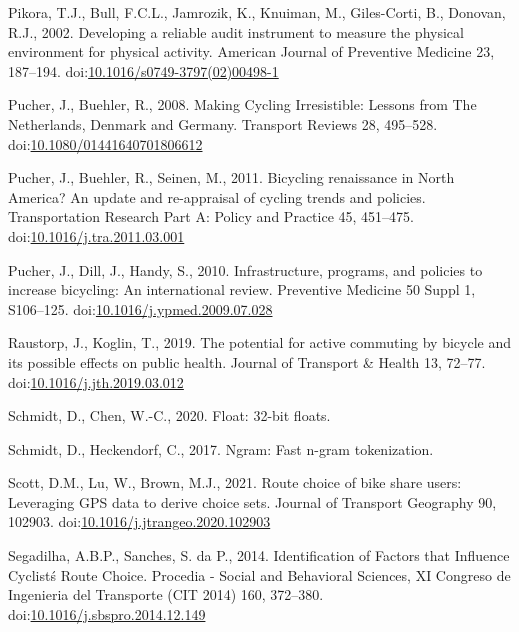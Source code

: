 \documentclass[]{elsarticle} %
\begin{document}
\leavevmode\hypertarget{ref-pikoraDevelopingReliableAudit2002}{}%
Pikora, T.J., Bull, F.C.L., Jamrozik, K., Knuiman, M., Giles-Corti, B.,
Donovan, R.J., 2002. Developing a reliable audit instrument to measure
the physical environment for physical activity. American Journal of
Preventive Medicine 23, 187--194.
doi:\href{https://doi.org/10.1016/s0749-3797(02)00498-1}{10.1016/s0749-3797(02)00498-1}

\leavevmode\hypertarget{ref-pucherMakingCyclingIrresistible2008}{}%
Pucher, J., Buehler, R., 2008. Making Cycling Irresistible: Lessons from
The Netherlands, Denmark and Germany. Transport Reviews 28, 495--528.
doi:\href{https://doi.org/10.1080/01441640701806612}{10.1080/01441640701806612}

\leavevmode\hypertarget{ref-pucherBicyclingRenaissanceNorth2011a}{}%
Pucher, J., Buehler, R., Seinen, M., 2011. Bicycling renaissance in
North America? An update and re-appraisal of cycling trends and
policies. Transportation Research Part A: Policy and Practice 45,
451--475.
doi:\href{https://doi.org/10.1016/j.tra.2011.03.001}{10.1016/j.tra.2011.03.001}

\leavevmode\hypertarget{ref-pucherInfrastructureProgramsPolicies2010a}{}%
Pucher, J., Dill, J., Handy, S., 2010. Infrastructure, programs, and
policies to increase bicycling: An international review. Preventive
Medicine 50 Suppl 1, S106--125.
doi:\href{https://doi.org/10.1016/j.ypmed.2009.07.028}{10.1016/j.ypmed.2009.07.028}

\leavevmode\hypertarget{ref-raustorpPotentialActiveCommuting2019}{}%
Raustorp, J., Koglin, T., 2019. The potential for active commuting by
bicycle and its possible effects on public health. Journal of Transport
\& Health 13, 72--77.
doi:\href{https://doi.org/10.1016/j.jth.2019.03.012}{10.1016/j.jth.2019.03.012}

\leavevmode\hypertarget{ref-R-float}{}%
Schmidt, D., Chen, W.-C., 2020. Float: 32-bit floats.

\leavevmode\hypertarget{ref-R-ngram}{}%
Schmidt, D., Heckendorf, C., 2017. Ngram: Fast n-gram tokenization.

\leavevmode\hypertarget{ref-scottRouteChoiceBike2021}{}%
Scott, D.M., Lu, W., Brown, M.J., 2021. Route choice of bike share
users: Leveraging GPS data to derive choice sets. Journal of Transport
Geography 90, 102903.
doi:\href{https://doi.org/10.1016/j.jtrangeo.2020.102903}{10.1016/j.jtrangeo.2020.102903}

\leavevmode\hypertarget{ref-segadilhaIdentificationFactorsThat2014a}{}%
Segadilha, A.B.P., Sanches, S. da P., 2014. Identification of Factors
that Influence Cyclistś Route Choice. Procedia - Social and Behavioral
Sciences, XI Congreso de Ingenieria del Transporte (CIT 2014) 160,
372--380.
doi:\href{https://doi.org/10.1016/j.sbspro.2014.12.149}{10.1016/j.sbspro.2014.12.149}
\end{document}
